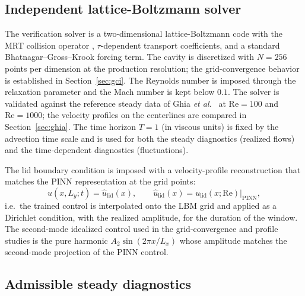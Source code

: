 \documentclass[aip,pof,reprint,superscriptaddress]{revtex4-2}
\newcommand{\re}{\mathrm{Re}}
\begin{document}
\subsection{Independent lattice-Boltzmann solver}

The verification solver is a two-dimensional lattice-Boltzmann code with the MRT collision operator \cite{succi2001lattice}, $\tau$-dependent transport coefficients, and a standard Bhatnagar--Gross--Krook forcing term. The cavity is discretized with $N=256$ points per dimension at the production resolution; the grid-convergence behavior is established in Section~\ref{sec:gci}. The Reynolds number is imposed through the relaxation parameter and the Mach number is kept below $0.1$. The solver is validated against the reference steady data of Ghia \emph{et al.}~\cite{ghia1982high} at $\re=100$ and $\re=1000$; the velocity profiles on the centerlines are compared in Section~\ref{sec:ghia}. The time horizon $T=1$ (in viscous units) is fixed by the advection time scale and is used for both the steady diagnostics (realized flows) and the time-dependent diagnostics (fluctuations).

The lid boundary condition is imposed with a velocity-profile reconstruction that matches the PINN representation at the grid points:
\begin{equation}\label{eq:lbm_lid}
u(x,L_y;t)=\hat u_{\mathrm{lid}}(x),\qquad \hat u_{\mathrm{lid}}(x)=u_{\mathrm{lid}}(x;\re)\Big|_{\mathrm{PINN}},
\end{equation}
i.e.\ the trained control is interpolated onto the LBM grid and applied as a Dirichlet condition, with the realized amplitude, for the duration of the window. The second-mode idealized control used in the grid-convergence and profile studies is the pure harmonic $A_2\sin(2\pi x/L_x)$ whose amplitude matches the second-mode projection of the PINN control.

\subsection{Admissible steady diagnostics}
\end{document}
